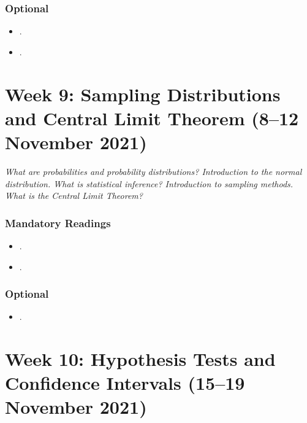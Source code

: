 \documentclass[abstract=on,parskip=full,headings=standardclasses,fontsize=11pt,paper=a4]{scrartcl}
\begin{document}
\subsubsection*{Optional}
\begin{itemize}
\item {}.
\item {}.
\end{itemize}




\section{Week 9:  Sampling Distributions and Central Limit Theorem (8--12 November 2021)}


\textit{What are probabilities and probability distributions? Introduction to the normal distribution. What is statistical inference? Introduction to sampling methods. What is the Central Limit Theorem?}


\subsubsection*{Mandatory Readings}
\begin{itemize}
\item {}.
\item {}.
\end{itemize}



\subsubsection*{Optional}
\begin{itemize}
\item {}.
\end{itemize}



\section{Week 10:  Hypothesis Tests and Confidence Intervals (15--19 November 2021)}
\end{document}
